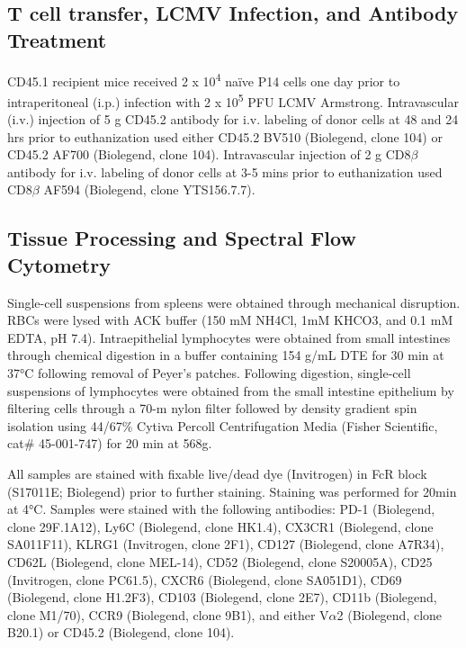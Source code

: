 
\subsection{T cell transfer, LCMV Infection, and Antibody Treatment}

CD45.1 recipient mice received 2 x 10\textsuperscript{4} naïve P14 cells one day prior to intraperitoneal (i.p.) infection with 2 x 10\textsuperscript{5} PFU LCMV Armstrong. Intravascular (i.v.) injection of 5 \textmu{}g CD45.2 antibody for i.v. labeling of donor cells at 48 and 24 hrs prior to euthanization used either CD45.2 BV510 (Biolegend, clone 104) or CD45.2 AF700 (Biolegend, clone 104). Intravascular injection of 2 \textmu{}g CD8$\beta$ antibody for i.v. labeling of donor cells at 3-5 mins prior to euthanization used CD8$\beta$ AF594 (Biolegend, clone YTS156.7.7).

\subsection{Tissue Processing and Spectral Flow Cytometry}

Single-cell suspensions from spleens were obtained through mechanical disruption. RBCs were lysed with ACK buffer (150 mM NH4Cl, 1mM KHCO3, and 0.1 mM EDTA, pH 7.4). Intraepithelial lymphocytes were obtained from small intestines through chemical digestion in a buffer containing 154 \textmu{}g/mL DTE for 30 min at 37°C following removal of Peyer's patches. Following digestion, single-cell suspensions of lymphocytes were obtained from the small intestine epithelium by filtering cells through a 70-\textmu{}m nylon filter followed by density gradient spin isolation using 44/67\% Cytiva Percoll Centrifugation Media (Fisher Scientific, cat\# 45-001-747) for 20 min at 568g.

All samples are stained with fixable live/dead dye (Invitrogen) in FcR block (S17011E; Biolegend) prior to further staining. Staining was performed for 20min at 4°C. Samples were stained with the following antibodies: PD-1 (Biolegend, clone 29F.1A12), Ly6C (Biolegend, clone HK1.4), CX3CR1 (Biolegend, clone SA011F11), KLRG1 (Invitrogen, clone 2F1), CD127 (Biolegend, clone A7R34), CD62L (Biolegend, clone MEL-14), CD52 (Biolegend, clone S20005A), CD25 (Invitrogen, clone PC61.5), CXCR6 (Biolegend, clone SA051D1), CD69 (Biolegend, clone H1.2F3), CD103 (Biolegend, clone 2E7), CD11b (Biolegend, clone M1/70), CCR9 (Biolegend, clone 9B1), and either V$\alpha$2 (Biolegend, clone B20.1) or CD45.2 (Biolegend, clone 104).

